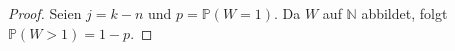 \documentclass[a4paper]{scrartcl}
\newcommand{\N}{\mathbb{N}}
\newcommand{\prob}{\mathbb{P}}
\begin{document}
\begin{enumerate}[label=\bfseries 1.\arabic*]
                        
        \begin{proof}
            Seien $j = k - n$ und $p = \prob(W = 1)$. Da $W$ auf $\N$ abbildet,
            folgt $\prob(W > 1) = 1 - p$.


\end{proof}
\end{enumerate}
\end{document}
